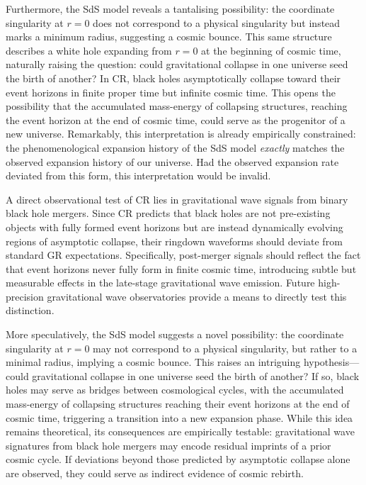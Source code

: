 \documentclass[aps,prd,reprint,superscriptaddress]{revtex4-2}
\begin{document}
Furthermore, the SdS model reveals a tantalising possibility: the coordinate singularity at $r=0$ does not correspond to a physical singularity but instead marks a minimum radius, suggesting a cosmic bounce. This same structure describes a white hole expanding from $r=0$ at the beginning of cosmic time, naturally raising the question: could gravitational collapse in one universe seed the birth of another? In CR, black holes asymptotically collapse toward their event horizons in finite proper time but infinite cosmic time. This opens the possibility that the accumulated mass-energy of collapsing structures, reaching the event horizon at the end of cosmic time, could serve as the progenitor of a new universe. Remarkably, this interpretation is already empirically constrained: the phenomenological expansion history of the SdS model \textit{exactly} matches the observed expansion history of our universe. Had the observed expansion rate deviated from this form, this interpretation would be invalid. 

A direct observational test of CR lies in gravitational wave signals from binary black hole mergers. Since CR predicts that black holes are not pre-existing objects with fully formed event horizons but are instead dynamically evolving regions of asymptotic collapse, their ringdown waveforms should deviate from standard GR expectations. Specifically, post-merger signals should reflect the fact that event horizons never fully form in finite cosmic time, introducing subtle but measurable effects in the late-stage gravitational wave emission. Future high-precision gravitational wave observatories provide a means to directly test this distinction.

More speculatively, the SdS model suggests a novel possibility: the coordinate singularity at $r=0$ may not correspond to a physical singularity, but rather to a minimal radius, implying a cosmic bounce. This raises an intriguing hypothesis---could gravitational collapse in one universe seed the birth of another? If so, black holes may serve as bridges between cosmological cycles, with the accumulated mass-energy of collapsing structures reaching their event horizons at the end of cosmic time, triggering a transition into a new expansion phase. While this idea remains theoretical, its consequences are empirically testable: gravitational wave signatures from black hole mergers may encode residual imprints of a prior cosmic cycle. If deviations beyond those predicted by asymptotic collapse alone are observed, they could serve as indirect evidence of cosmic rebirth. 
\end{document}
